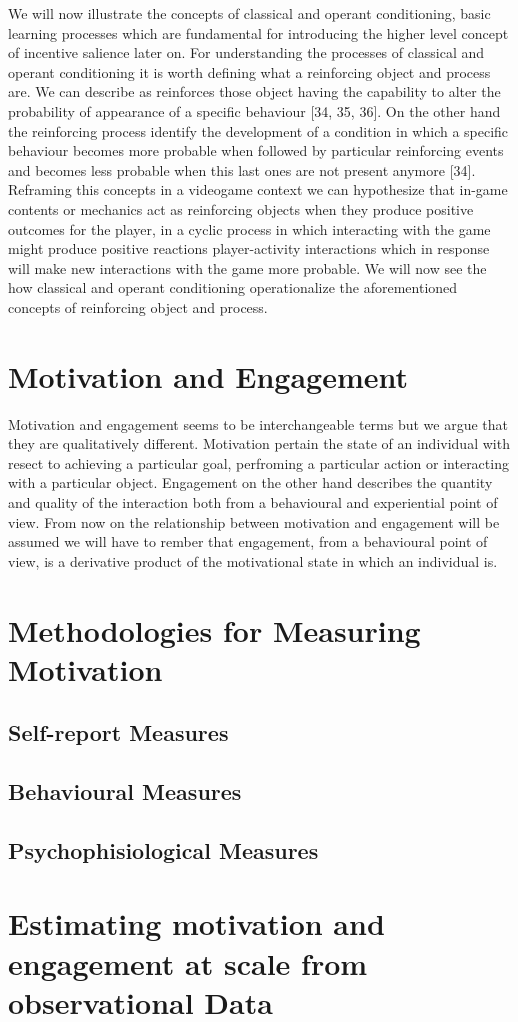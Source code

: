 We will now illustrate the concepts of classical and operant conditioning, basic learning processes which are fundamental for introducing the higher level concept of incentive salience later on. For understanding the processes of classical and operant conditioning it is worth defining what a reinforcing object and process are. We can describe as reinforces those object having the capability to alter the probability of appearance of a specific behaviour [34, 35, 36].  On the other hand the reinforcing process identify the development of a condition in which a specific behaviour becomes more probable when followed by particular reinforcing events and becomes less probable when this last ones are not present anymore [34]. Reframing this concepts in a videogame context we can hypothesize that in-game contents or mechanics act as reinforcing objects when they produce positive outcomes for the player, in a cyclic process in which interacting with the game might produce positive reactions player-activity interactions which in response will make new interactions with the game more probable. 
We will now see the how classical and operant conditioning operationalize the aforementioned concepts of reinforcing object and process.

\section{Motivation and Engagement}
Motivation and engagement seems to be interchangeable terms but we argue that they are qualitatively different. Motivation pertain the state of an individual with resect to achieving a particular goal, perfroming a particular action or interacting with a particular object. Engagement on the other hand describes the quantity and quality of the interaction both from a behavioural and experiential point of view. From now on the relationship between motivation and engagement will be assumed we will have to rember that engagement, from a behavioural point of view, is a derivative product of the motivational state in which an individual is. 

\section{Methodologies for Measuring Motivation}
    \subsection{Self-report Measures}
    \subsection{Behavioural Measures}
    \subsection{Psychophisiological Measures}

\section{Estimating motivation and engagement at scale from observational Data}
\lorem

\lorem


